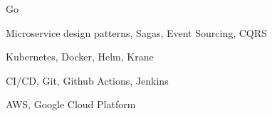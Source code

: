 \item Go
\item Microservice design patterns, Sagas, Event Sourcing, CQRS
\item Kubernetes, Docker, Helm, Krane
\item CI/CD, Git, Github Actions, Jenkins
\item AWS, Google Cloud Platform
